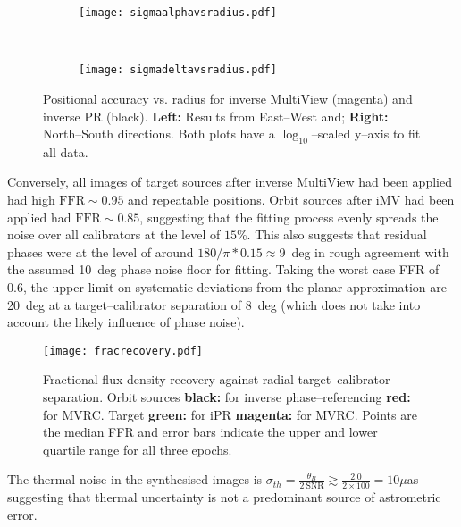 	\begin{figure}[h]
		\centering
		\begin{subfigure}[t]{0.45\textwidth}
			\centering
			\texttt{[image: sigmaalphavsradius.pdf]} 
		\end{subfigure}	
		~
		\begin{subfigure}[t]{0.45\textwidth}
			\centering
			\texttt{[image: sigmadeltavsradius.pdf]} 
		\end{subfigure}	
		\caption[Positional Uncertainty vs. Radius Centre]{Positional accuracy vs. radius for inverse MultiView (magenta) and inverse PR (black). \textbf{Left:} Results from East--West and; \textbf{Right:} North--South directions. Both plots have a $\log_{10}$--scaled y--axis to fit all data.}
		\label{fig:sigvsmid}
	\end{figure} 
	Conversely, all images of target sources after inverse MultiView had been applied had high $\text{FFR}\sim0.95$ and repeatable positions. %
	Orbit sources after iMV had been applied had $\text{FFR}\sim0.85$, suggesting that the fitting process evenly spreads the noise over all calibrators at the level of $15\%$. This also suggests that residual phases were at the level of around $180/\pi*0.15\approx9$~deg in rough agreement with the assumed 10~deg phase noise floor for fitting. Taking the worst case FFR of 0.6, the upper limit on systematic deviations from the planar approximation are 20~deg at a target--calibrator separation of 8~deg (which does not take into account the likely influence of phase noise). %
	\begin{SCfigure}[][h]
		\centering
		\texttt{[image: fracrecovery.pdf]}
		\caption[Fractional Flux Recovery vs. Radius Orbit]{Fractional flux density recovery against radial target--calibrator separation. Orbit sources \textbf{black:} for inverse phase--referencing \textbf{red:} for MVRC. Target \textbf{green:} for iPR \textbf{magenta:} for MVRC. Points are the median FFR and error bars indicate the upper and lower quartile range for all three epochs.}
		\label{ffrvsrorbit}
	\end{SCfigure} The thermal noise in the synthesised images is $\sigma_{th}=\frac{\theta_B}{2~\text{SNR}}\gtrsim\frac{2.0}{2\times100}=10\mu$as suggesting that thermal uncertainty is not a predominant source of astrometric error.%
	
